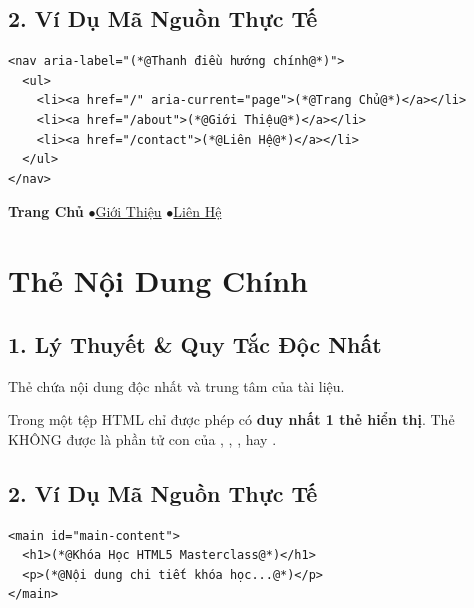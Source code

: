\subsection{2. Ví Dụ Mã Nguồn Thực Tế}
\begin{codeWindow}
\begin{lstlisting}[language=HTML5]
<nav aria-label="(*@Thanh điều hướng chính@*)">
  <ul>
    <li><a href="/" aria-current="page">(*@Trang Chủ@*)</a></li>
    <li><a href="/about">(*@Giới Thiệu@*)</a></li>
    <li><a href="/contact">(*@Liên Hệ@*)</a></li>
  </ul>
</nav>
\end{lstlisting}
\end{codeWindow}

\begin{browserWindow}
\sffamily\small
\textcolor{primaryBlue}{\bfseries Trang Chủ} \quad$\bullet$\quad \textcolor{primaryBlue}{\underline{Giới Thiệu}} \quad$\bullet$\quad \textcolor{primaryBlue}{\underline{Liên Hệ}}
\end{browserWindow}

\section{Thẻ Nội Dung Chính }
\subsection{1. Lý Thuyết \& Quy Tắc Độc Nhất}
Thẻ  chứa nội dung độc nhất và trung tâm của tài liệu.

\begin{warnBox}
Trong một tệp HTML chỉ được phép có \textbf{duy nhất 1 thẻ  hiển thị}. Thẻ  KHÔNG được là phần tử con của , , ,  hay .
\end{warnBox}

\subsection{2. Ví Dụ Mã Nguồn Thực Tế}
\begin{codeWindow}
\begin{lstlisting}[language=HTML5]
<main id="main-content">
  <h1>(*@Khóa Học HTML5 Masterclass@*)</h1>
  <p>(*@Nội dung chi tiết khóa học...@*)</p>
</main>
\end{lstlisting}
\end{codeWindow}


